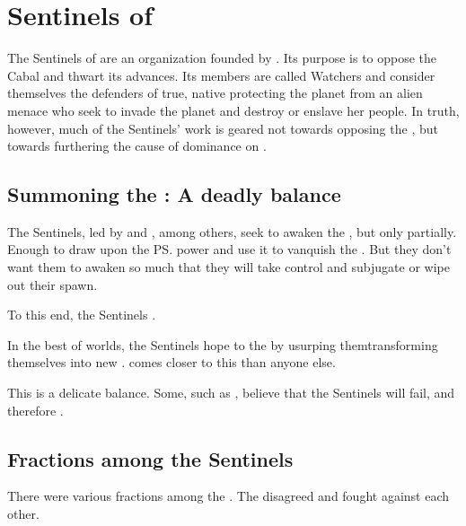 \section{Sentinels of \Miith}
The Sentinels of \Miith{} are an organization founded by \dragons{}. Its purpose is to oppose the Cabal and thwart its advances. Its members are called Watchers and consider themselves the defenders of \Miith\dash{}true, native \Miithians protecting the planet from an alien menace who seek to invade the planet and destroy or enslave her people. In truth, however, much of the Sentinels' work is geared not towards opposing the \banes{}, but towards furthering the cause of \draconic{} dominance on \Miith{}. 









\subsection{Summoning the \xss: A deadly balance}
The Sentinels, led by \Secherdamon{} and \Vizsherioch, among others, seek to awaken the \xss, but only partially. Enough to draw upon the \ps{\xss}{} power and use it to vanquish the \banes. But they don't want them to awaken so much that they will take control and subjugate or wipe out their \draconic{} spawn. 

To this end, the Sentinels . 

In the best of worlds, the Sentinels hope to  the \xss{} by usurping them\dash transforming themselves into new \xss. \Vizsherioch{} comes closer to this than anyone else.

This is a delicate balance. Some, such as \Ishnaruchaefir, believe that the Sentinels will fail, and therefore .









\subsection{Fractions among the Sentinels}
There were various fractions among the \dragons. 
The \dragons disagreed and fought against each other.

